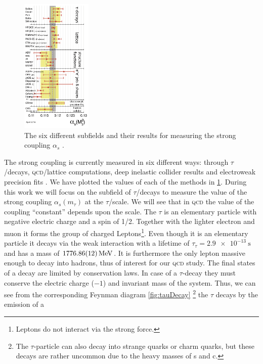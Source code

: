 \documentclass[../../index.tex]{subfiles}
\begin{document}
\begin{figure}
  \includegraphics[width=0.3\textwidth]{./images/alphasDetermination.png}
  \caption{The six different subfields and their results for measuring the
    strong coupling $\alpha_s$ \cite{PDG2018}.}
  \label{fig:alphaSDetermination}
\end{figure}
The strong coupling is currently measured in six different ways: through
$\tau$\-/decays, \textsc{qcd}\-/lattice computations, deep inelastic collider
results and electroweak precision fits \cite{PSG2018}. We have plotted the
values of each of the methods in \cref{fig:alphaSDetermination}. During this
work we will focus on the subfield of $\tau$\-/decays to measure the value of
the strong coupling $\alpha_s(m_\tau)$ at the $\tau$\-/scale. We will see that
in \textsc{qcd} the value of the coupling ``constant'' depends upon the scale.
The $\tau$ is an elementary particle with negative electric charge and a spin of
1/2. Together with the lighter electron and muon it forms the group of charged
Leptons\footnote{Leptons do not interact via the strong force.}. Even though it
is an elementary particle it decays via the weak interaction with a lifetime of
$\tau_\tau=\SI{2.9e-13}{\second}$ and has a mass of
$\SI{1776.86\pm0.12}{\mega\electronvolt}$\cite{PDG2018}. It is furthermore the
only lepton massive enough to decay into hadrons, thus of interest for our
\textsc{qcd} study. The final states of a decay are limited by conservation
laws. In case of a $\tau$-decay they must conserve the electric charge ($-1$)
and invariant mass of the system. Thus, we can see from the corresponding
Feynman diagram \cref{fig:tauDecay} \footnote{The $\tau$-particle can also decay
  into strange quarks or charm quarks, but these decays are rather uncommon due
  to the heavy masses of s and c.} the $\tau$ decays by the emission of a
\end{document}
